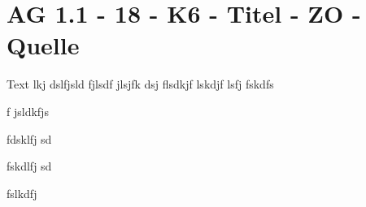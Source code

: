 \section{AG 1.1 - 18 - K6 - Titel - ZO - Quelle}

\begin{beispiel}[AG 1.1]{1}
Text lkj dslfjsld fjlsdf jlsjfk dsj flsdkjf lskdjf lsfj
 fskdfs
 
 f jsldkfjs
 
 
 fdsklfj sd
 
 
 fskdlfj sd
 
 
 fslkdfj

\end{beispiel}